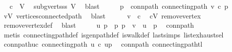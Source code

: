 \begin{isabellebody}
\ \isamarkupfalse%
\ {\isachardoublequoteopen}c\ {\isasymin}\ V{\isachardoublequoteclose}\ \isamarkupfalse%
\ subg{\isachardot}{\kern0pt}verts{\isacharunderscore}{\kern0pt}ss\ V{\isacharprime}{\kern0pt}\ \isamarkupfalse%
\ blast\isanewline
\ \ \isamarkupfalse%
\ \isamarkupfalse%
\ p\ \ conn{\isacharunderscore}{\kern0pt}path{\isacharcolon}{\kern0pt}\ {\isachardoublequoteopen}connecting{\isacharunderscore}{\kern0pt}path\ v\ c\ p{\isachardoublequoteclose}\ \isamarkupfalse%
\ {\isacartoucheopen}v{\isasymin}V{\isacartoucheclose}\ vertices{\isacharunderscore}{\kern0pt}connected{\isacharunderscore}{\kern0pt}path\ \isamarkupfalse%
\ blast\ \ \isanewline
\ \ \isamarkupfalse%
\ {\isachardoublequoteopen}v\ {\isasymnoteq}\ c{\isachardoublequoteclose}\ \isamarkupfalse%
\ {\isacartoucheopen}c{\isasymin}V{\isacharprime}{\kern0pt}{\isacartoucheclose}\ remove{\isacharunderscore}{\kern0pt}vertex\ \isamarkupfalse%
\ remove{\isacharunderscore}{\kern0pt}vertex{\isacharunderscore}{\kern0pt}def\ \isamarkupfalse%
\ blast\isanewline
\ \ \isamarkupfalse%
\ \isamarkupfalse%
\ u\ p{\isacharprime}{\kern0pt}\ \ p{\isacharcolon}{\kern0pt}\ {\isachardoublequoteopen}p\ {\isacharequal}{\kern0pt}\ v\ {\isacharhash}{\kern0pt}\ u\ {\isacharhash}{\kern0pt}\ p{\isacharprime}{\kern0pt}{\isachardoublequoteclose}\ \isamarkupfalse%
\ conn{\isacharunderscore}{\kern0pt}path\isanewline
\ \ \ \ \isamarkupfalse%
\ {\isacharparenleft}{\kern0pt}metis\ connecting{\isacharunderscore}{\kern0pt}path{\isacharunderscore}{\kern0pt}def\ is{\isacharunderscore}{\kern0pt}gen{\isacharunderscore}{\kern0pt}path{\isacharunderscore}{\kern0pt}def\ is{\isacharunderscore}{\kern0pt}walk{\isacharunderscore}{\kern0pt}def\ last{\isachardot}{\kern0pt}simps\ list{\isachardot}{\kern0pt}exhaust{\isacharunderscore}{\kern0pt}sel{\isacharparenright}{\kern0pt}\isanewline
\ \ \isamarkupfalse%
\ \isamarkupfalse%
\ conn{\isacharunderscore}{\kern0pt}path{\isacharunderscore}{\kern0pt}uc{\isacharcolon}{\kern0pt}\ {\isachardoublequoteopen}connecting{\isacharunderscore}{\kern0pt}path\ u\ c\ {\isacharparenleft}{\kern0pt}u{\isacharhash}{\kern0pt}p{\isacharprime}{\kern0pt}{\isacharparenright}{\kern0pt}{\isachardoublequoteclose}\ \isamarkupfalse%
\ conn{\isacharunderscore}{\kern0pt}path\ connecting{\isacharunderscore}{\kern0pt}path{\isacharunderscore}{\kern0pt}tl\ \isamarkupfalse%

\end{isabellebody}
